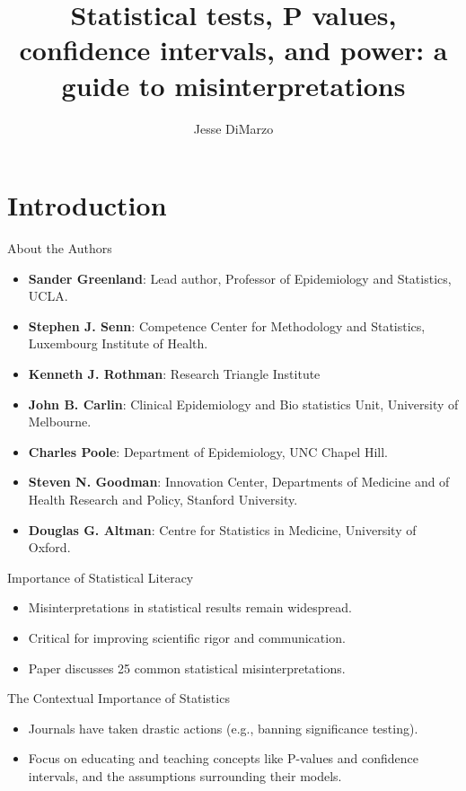 \documentclass[aspectratio=169, 12pt]{beamer}
\title{Statistical tests, P values, confidence intervals, and power: a guide
to misinterpretations}
\author{Jesse DiMarzo}
\date{}
\begin{document}
 
\frame{\titlepage}

\section{Introduction}
\begin{frame}{About the Authors}
\begin{itemize}
    \item \textbf{Sander Greenland}: Lead author, Professor of Epidemiology and Statistics, UCLA.
    \item \textbf{Stephen J. Senn}: Competence Center for Methodology and Statistics, Luxembourg Institute of Health.
    \item \textbf{Kenneth J. Rothman}: Research Triangle Institute
    \item \textbf{John B. Carlin}: Clinical Epidemiology and Bio statistics Unit, University of Melbourne.
    \item \textbf{Charles Poole}: Department of Epidemiology, UNC Chapel Hill.
    \item \textbf{Steven N. Goodman}:  Innovation Center, Departments of Medicine
and of Health Research and Policy, Stanford University.
    \item \textbf{Douglas G. Altman}: Centre for Statistics in Medicine, University of Oxford.
\end{itemize}
\end{frame}
 

\begin{frame}{Importance of Statistical Literacy}
\begin{itemize}
    \item Misinterpretations in statistical results remain widespread.
    \vspace{0.5cm}
    \item Critical for improving scientific rigor and communication. 
    \vspace{0.5cm}
    \item Paper discusses 25 common statistical misinterpretations.
\end{itemize}
\end{frame}




\begin{frame}{The Contextual Importance of Statistics}
\begin{itemize}
    \item Journals have taken drastic actions (e.g., banning significance testing).
    \vspace{0.5cm}
    \item Focus on educating and teaching concepts like P-values and confidence intervals, and the assumptions surrounding their models.
\end{itemize}
\end{frame}
\end{document}
